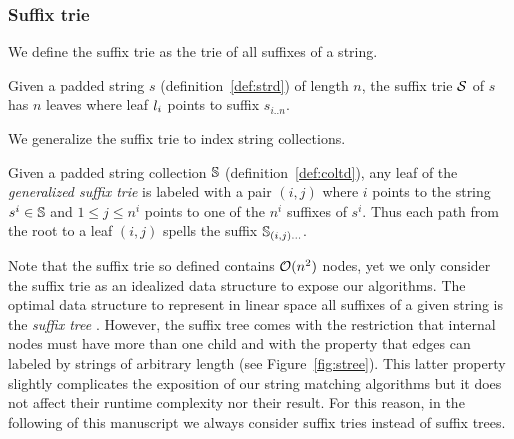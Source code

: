 \subsubsection{Suffix trie}

We define the suffix trie as the trie of all suffixes of a string.
\begin{definition}
Given a padded string $s$ (definition~\ref{def:strd}) of length $n$, the suffix trie $\mathcal {S}$ of $s$ has $n$ leaves where leaf $l_i$ points to suffix $s_{i..n}$.
\end{definition}
We generalize the suffix trie to index string collections.
\begin{definition}
Given a padded string collection $\mathbb {S}$ (definition~\ref{def:coltd}), any leaf of the \emph{generalized suffix trie} is labeled with a pair $(i,j)$ where $i$ points to the string $s^i \in \mathbb {S}$ and $1 \leq j \leq n^i$ points to one of the $n^i$ suffixes of $s^i$.
Thus each path from the root to a leaf $(i,j)$ spells the suffix $\mathbb {S}_{(i,j) \dots}$.
\end{definition}

Note that the suffix trie so defined contains $\mathcal{O}(n^2)$ nodes, yet we only consider the suffix trie as an idealized data structure to expose our algorithms.
The optimal data structure to represent in linear space all suffixes of a given string is the \emph{suffix tree} \citep{Morrison1968}.
However, the suffix tree comes with the restriction that internal nodes must have more than one child and with the property that edges can labeled by strings of arbitrary length (see Figure~\ref{fig:stree}).
This latter property slightly complicates the exposition of our string matching algorithms but it does not affect their runtime complexity nor their result.
For this reason, in the following of this manuscript we always consider \wlogs suffix tries instead of suffix trees.

\begin{figure}[h]
\caption[Example of suffix trie and suffix tree]{Suffix trie and suffix tree for the string ANANAS\$.}
\label{fig:stree}
\begin{subfigure}{.5\textwidth}
\begin{center}

\end{center}
\end{subfigure}%
\begin{subfigure}{.5\textwidth}
\begin{center}

\end{center}
\end{subfigure}
\end{figure}


